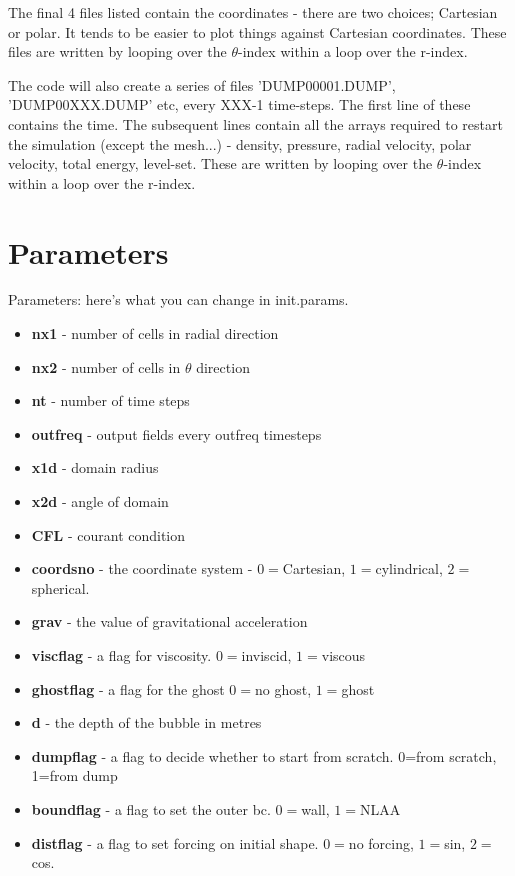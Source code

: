 \documentclass{article}
\begin{document}
The final 4 files listed contain the coordinates - there are two choices; Cartesian or polar. It tends to be easier to plot things against Cartesian coordinates. These files are written by looping over the $\theta$-index within a loop over the r-index.

The code will also create a series of files 'DUMP00001.DUMP', 'DUMP00XXX.DUMP' etc, every XXX-1 time-steps. The first line of these contains the time. The subsequent lines contain all the arrays required to restart the simulation (except the mesh...) - density, pressure, radial velocity, polar velocity, total energy, level-set. These are written by looping over the $\theta$-index within a loop over the r-index.
\section{Parameters}

Parameters: here's what you can change in init.params.
\begin{itemize}
\item \textbf{nx1} - number of cells in radial direction
\item \textbf{nx2} - number of cells in $\theta$ direction
\item \textbf{nt} - number of time steps
\item \textbf{outfreq} - output fields every outfreq timesteps
\item \textbf{x1d} - domain radius
\item \textbf{x2d} - angle of domain
\item \textbf{CFL} - courant condition
\item \textbf{coordsno} - the coordinate system - $0=$Cartesian, $1=$cylindrical, $2=$spherical.
\item \textbf{grav} - the value of gravitational acceleration
\item \textbf{viscflag} - a flag for viscosity. $0=$inviscid, $1=$viscous
\item \textbf{ghostflag} - a flag for the ghost $0=$no ghost, $1=$ghost
\item \textbf{d} - the depth of the bubble in metres
\item \textbf{dumpflag} - a flag to decide whether to start from scratch. 0=from scratch, 1=from dump
\item \textbf{boundflag} - a flag to set the outer bc. $0=$wall, $1=$NLAA
\item \textbf{distflag} - a flag to set forcing on initial shape. $0=$no forcing, $1=$sin, $2=$cos.
\end{itemize}
\end{document}
